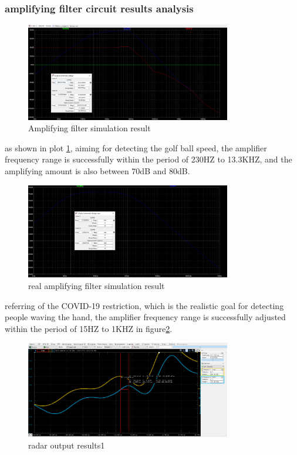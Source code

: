 \subsubsection{amplifying filter circuit results analysis}
\begin{figure}[H]
    \centering
    \includegraphics[width=0.8\textwidth]{figure/Amplifyingfiltersimulation result.png}
    \caption{Amplifying filter simulation result}
     \label{fig:amplifying}
\end{figure}
as shown in plot \ref{fig:amplifying}, aiming for detecting the golf ball speed, the amplifier frequency range is successfully within the period of 230HZ to 13.3KHZ, and the amplifying amount is also between 70dB and 80dB.
\begin{figure}[H]
    \centering
    \includegraphics[width=0.8\textwidth]{figure/realamplifyingfiltersimulationresult.png}
    \caption{real amplifying filter simulation result}
     \label{fig:amplifying_real}
\end{figure}
referring of the COVID-19 restriction, which is the realistic goal for detecting people waving the hand, the amplifier frequency range is successfully adjusted within the period of 15HZ to 1KHZ in figure\ref{fig:amplifying_real}. 
\begin{figure}[H]
    \centering
    \includegraphics[width=0.8\textwidth]{figure/radar output results1.png}
    \caption{radar output results1}
     \label{fig:radar_output}
\end{figure}
